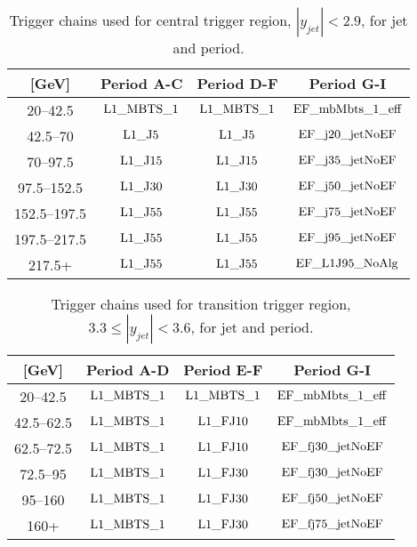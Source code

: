 \begin{table}[htdp]
\centering
\begin{tabular}{ | c | c | c | c | }
  \hline
 \pt{} [GeV] & Period A-C & Period D-F & Period G-I \\
  \hline
20--42.5 &  $ \rm L1\_ MBTS\_ 1$ & $ \rm L1\_ MBTS\_ 1$ & $ \rm EF\_ mbMbts\_ 1\_ eff$  \\
42.5--70 &  $ \rm L1\_ J5$ &     $ \rm L1\_ J5$ &     $ \rm EF\_ j20\_ jetNoEF$  \\
70--97.5 &   $ \rm L1\_ J15$ &    $ \rm L1\_ J15$ &    $ \rm EF\_ j35\_ jetNoEF$  \\
97.5--152.5 &   $ \rm L1\_ J30$ &    $ \rm L1\_ J30$ &    $ \rm EF\_ j50\_ jetNoEF$  \\
152.5--197.5 &  $ \rm L1\_ J55$ &    $ \rm L1\_ J55$ &    $ \rm EF\_ j75\_ jetNoEF$  \\
197.5--217.5 &  $ \rm L1\_ J55$ &    $ \rm L1\_ J55$ &    $ \rm EF\_ j95\_ jetNoEF$  \\
217.5+ &     $ \rm L1\_ J55$ &    $ \rm L1\_ J55$ &    $ \rm EF\_ L1J95\_ NoAlg$ \\

  \hline
\end{tabular}
\caption[Triggers used for jets in the central region]{
Trigger chains used for central trigger region, $|y_{jet}|<2.9$, for jet \pt{} and period.
\label{tab:CentralTrigger}}
\end{table}%


\begin{table}[htdp]
\centering
\begin{tabular}{ | c | c | c | c | }
\hline
\pt{} [GeV] & Period A-D  & Period E-F & Period G-I \\
      \hline
         20--42.5 &     $ \rm L1\_ MBTS\_ 1$ & $ \rm L1\_ MBTS\_ 1$  &   $ \rm EF\_ mbMbts\_ 1\_ eff$  \\
         42.5--62.5 &   $ \rm L1\_ MBTS\_ 1$ & $ \rm L1\_ FJ10$      &   $ \rm EF\_ mbMbts\_ 1\_ eff$  \\
         62.5--72.5 &   $ \rm L1\_ MBTS\_ 1$ & $ \rm L1\_ FJ10$      &   $ \rm EF\_ fj30\_ jetNoEF$  \\
         72.5--95 &     $ \rm L1\_ MBTS\_ 1$ & $ \rm L1\_ FJ30$      &   $ \rm EF\_ fj30\_ jetNoEF$  \\
         95--160 &      $ \rm L1\_ MBTS\_ 1$ & $ \rm L1\_ FJ30$      &   $ \rm EF\_ fj50\_ jetNoEF$  \\
         160+ &         $ \rm L1\_ MBTS\_ 1$ & $ \rm L1\_ FJ30$      &   $ \rm EF\_ fj75\_ jetNoEF$  \\
         \hline
      \end{tabular}
\caption[Triggers used for jets in the transition region]{
      Trigger chains used for transition trigger region, $3.3\le|y_{jet}|<3.6$, for jet \pt{} and period.
      \label{tab:TransTrigger}}
\end{table}%

